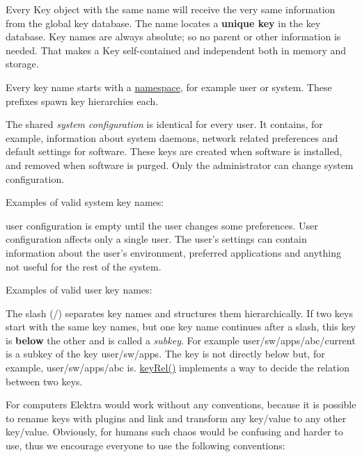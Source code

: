 Every {\ttfamily Key} object with the same name will receive the very same information from the global key database. The name locates a {\bfseries unique key} in the key database. Key names are always absolute; so no parent or other information is needed. That makes a {\ttfamily Key} self-\/contained and independent both in memory and storage.

Every key name starts with a \hyperlink{md_doc_help_elektra-namespaces_doc_help_elektra-namespaces_md}{namespace}, for example {\ttfamily user} or {\ttfamily system}. These prefixes spawn key hierarchies each.

The shared {\itshape system configuration} is identical for every user. It contains, for example, information about system daemons, network related preferences and default settings for software. These keys are created when software is installed, and removed when software is purged. Only the administrator can change system configuration.

Examples of valid system key names\+: 


user configuration is empty until the user changes some preferences. User configuration affects only a single user. The user's settings can contain information about the user's environment, preferred applications and anything not useful for the rest of the system.

Examples of valid user key names\+: 


The slash ({\ttfamily /}) separates key names and structures them hierarchically. If two keys start with the same key names, but one key name continues after a slash, this key is {\bfseries below} the other and is called a {\itshape subkey}. For example {\ttfamily user/sw/apps/abc/current} is a subkey of the key {\ttfamily user/sw/apps}. The key is not directly below but, for example, {\ttfamily user/sw/apps/abc} is. {\ttfamily \hyperlink{group__keytest_ga6bb0f95ac34ce9c42d61bb35a76139d0}{key\+Rel()}} implements a way to decide the relation between two keys.

For computers Elektra would work without any conventions, because it is possible to rename keys with plugins and link and transform any key/value to any other key/value. Obviously, for humans such chaos would be confusing and harder to use, thus we encourage everyone to use the following conventions\+:

